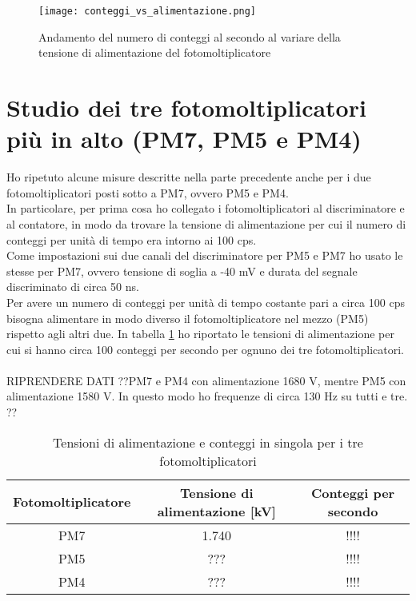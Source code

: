 \documentclass{article}
\begin{document}
\begin{figure}[h]
\begin{center}
\texttt{[image: conteggi\_vs\_alimentazione.png]}
\caption{Andamento del numero di conteggi al secondo al variare della tensione di alimentazione del fotomoltiplicatore} \label{f2}
\end{center}
\end{figure}

\section{Studio dei tre fotomoltiplicatori più in alto (PM7, PM5 e PM4)}
Ho ripetuto alcune misure descritte nella parte precedente anche per i due fotomoltiplicatori posti sotto a PM7, ovvero PM5 e PM4. \\
In particolare, per prima cosa ho collegato i fotomoltiplicatori al discriminatore e al contatore, in modo da trovare la tensione di alimentazione per cui il numero di conteggi  per unità di tempo era intorno ai 100 cps.
\\
Come impostazioni sui due canali del discriminatore per PM5 e PM7 ho usato le stesse per PM7, ovvero tensione di soglia a -40 mV e durata del segnale discriminato di circa 50 ns. 
\\
Per avere un numero di conteggi per unità di tempo costante pari a circa 100 cps bisogna alimentare in modo diverso il fotomoltiplicatore nel mezzo (PM5) rispetto agli altri due. In tabella \ref{tab2} ho riportato le tensioni di alimentazione per cui si hanno circa 100 conteggi per secondo per ognuno dei tre fotomoltiplicatori. 
\\
\\
RIPRENDERE DATI
??PM7 e PM4 con alimentazione 1680 V, mentre PM5 con alimentazione 1580 V. 
In questo modo ho frequenze di circa 130 Hz su tutti e tre. ??
\begin{table}[h!]
    \centering
    \begin{tabular}{|c|c|c|}
        \hline
        Fotomoltiplicatore & Tensione di alimentazione [kV] & Conteggi per secondo\\
        \hline
            PM7 & 1.740 & !!!!   \\
            PM5 & ??? & !!!!   \\
            PM4 & ??? & !!!!   \\
        \hline
    \end{tabular}
    \caption{Tensioni di alimentazione e conteggi in singola per i tre fotomoltiplicatori}
    \label{tab2}
\end{table}
\end{document}
